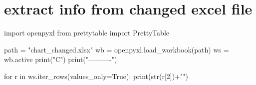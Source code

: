 \documentclass{article}
\begin{document}
\section{extract info from changed excel file}

\begin{pycode}
import openpyxl
from prettytable import PrettyTable 

path = "chart_changed.xlsx"
wb = openpyxl.load_workbook(path)
ws = wb.active
print("C\n")
print("----------\n")

for r in ws.iter_rows(values_only=True):
    print(str(r[2])+"\n") 


\end{pycode}
\end{document}
